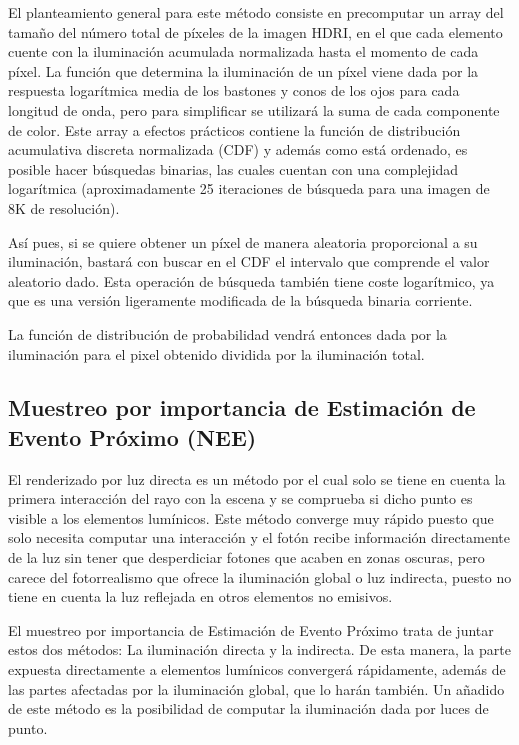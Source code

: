 El planteamiento general para este método consiste en precomputar un array del tamaño del número total de píxeles de la imagen HDRI, en el que cada elemento cuente con la iluminación acumulada normalizada hasta el momento de cada píxel.
La función que determina la iluminación de un píxel viene dada por la respuesta logarítmica media de los bastones y conos de los ojos para cada longitud de onda, pero para simplificar se utilizará la suma de cada componente de color. Este array a efectos prácticos contiene la función de distribución acumulativa discreta normalizada (CDF) y además como está ordenado, es posible hacer búsquedas binarias, las cuales cuentan con una complejidad logarítmica (aproximadamente 25 iteraciones de búsqueda para una imagen de 8K de resolución).



Así pues, si se quiere obtener un píxel de manera aleatoria proporcional a su iluminación, bastará con buscar en el CDF el intervalo que comprende el valor aleatorio dado. Esta operación de búsqueda también tiene coste logarítmico, ya que es una versión ligeramente modificada de la búsqueda binaria corriente.

La función de distribución de probabilidad vendrá entonces dada por la iluminación para el pixel obtenido dividida por la iluminación total.


\subsection{Muestreo por importancia de Estimación de Evento Próximo (NEE)}



El renderizado por luz directa es un método por el cual solo se tiene en cuenta la primera interacción del rayo con la escena y se comprueba si dicho punto es visible a los elementos lumínicos. Este método converge muy rápido puesto que solo necesita computar una interacción y el fotón recibe información directamente de la luz sin tener que desperdiciar fotones que acaben en zonas oscuras, pero carece del fotorrealismo que ofrece la iluminación global o luz indirecta, puesto no tiene en cuenta la luz reflejada en otros elementos no emisivos.

El muestreo por importancia de Estimación de Evento Próximo trata de juntar estos dos métodos: La iluminación directa y la indirecta. De esta manera, la parte expuesta directamente a elementos lumínicos convergerá rápidamente, además de las partes afectadas por la iluminación global, que lo harán también. Un añadido de este método es la posibilidad de computar la iluminación dada por luces de punto.

